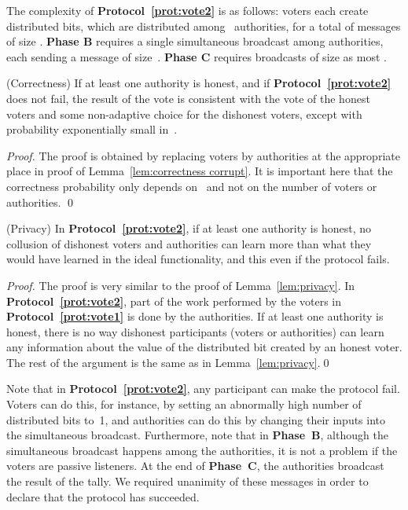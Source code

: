 \documentclass[runningheads]{llncs}
\begin{document}
The complexity of \textbf{Protocol~\ref{prot:vote2}} is as follows:
 voters each create  distributed bits, which are
distributed among~ authorities,  for a total of  messages of
size . \textbf{Phase B} requires a single simultaneous
broadcast among  authorities, each sending a message of size~. \textbf{Phase C} requires   broadcasts of size as most .

\begin{lemma}(Correctness)
\label{lem2:correctness corrupt}
If at least one authority is
honest, and if \textbf{Protocol~\ref{prot:vote2}} does not fail, the
result of the vote is consistent with the vote of the honest voters
and some non-adaptive choice for the dishonest voters, except with
probability exponentially small in~.
\end{lemma}


\begin{proof}
The proof is obtained by replacing voters by authorities at the
appropriate place in proof of Lemma~\ref{lem:correctness corrupt}.
It is important here that the correctness probability only depends
on~ and not on the number of voters or authorities. \qed
\end{proof}

\begin{lemma}(Privacy)
\label{lem2:privacy} In \textbf{Protocol~\ref{prot:vote2}}, if at
least one authority is honest, no collusion of dishonest voters and
authorities can learn more than what they would have learned in the
ideal functionality, and this even if the protocol fails.
\end{lemma}

\begin{proof}
The proof is very  similar to the proof of Lemma~\ref{lem:privacy}.
In \textbf{Protocol~\ref{prot:vote2}}, part of the work performed by
the voters in \textbf{Protocol~\ref{prot:vote1}} is done by the
authorities. If at least one authority is honest, there is no way
dishonest participants (voters or authorities) can learn any
information about the value of the distributed bit created by an
honest voter. The rest of the argument is the same as in
Lemma~\ref{lem:privacy}.\qed
\end{proof}

Note that in \textbf{Protocol~\ref{prot:vote2}}, any participant can
make the protocol fail. Voters can do this, for instance, by setting
an abnormally high number of distributed bits to~1, and authorities
can do this by changing their inputs into the simultaneous
broadcast. Furthermore, note  that in \textbf{Phase~B}, although the
simultaneous broadcast happens among the authorities, it is not a
problem if the voters are passive listeners. At the end of
\textbf{Phase~C}, the authorities broadcast the result of the tally.
We required unanimity of these messages in order to declare that the
protocol has succeeded.
\end{document}
